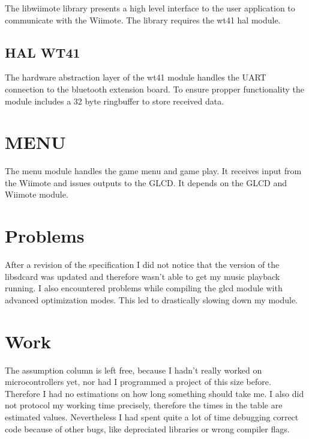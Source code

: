 \documentclass[12pt,a4paper,titlepage,oneside]{article}
\begin{document}
The libwiimote library presents a high level interface to the user application
to communicate with the Wiimote.
\noindent
The library requires the wt41 hal module.

\subsection{HAL WT41}

The hardware abstraction layer of the wt41 module handles the UART
connection to the bluetooth extension board. To ensure propper functionality
the module includes a 32 byte ringbuffer to store received data.

\section{MENU}

The menu module handles the game menu and game play. It receives input from
the Wiimote and issues outputs to the GLCD. 
\noindent
It depends on the GLCD and Wiimote module. 

\newpage

\section{Problems}

After a revision of the specification I did not notice that the version of the
libsdcard was updated and therefore wasn't able to get my music playback running.
\noindent
I also encountered problems while compiling the glcd module with advanced 
optimization modes. This led to drastically slowing down my module. 

\section{Work}

The assumption column is left free, because I hadn't really worked on microcontrollers 
yet, nor had I programmed a project of this size before. Therefore I had no estimations
on how long something should take me. I also did not protocol my working time precisely, therefore
the times in the table are estimated values. Nevertheless I had spent quite a lot of time 
debugging correct code because of other bugs, like depreciated libraries or wrong 
compiler flags. 
\end{document}

